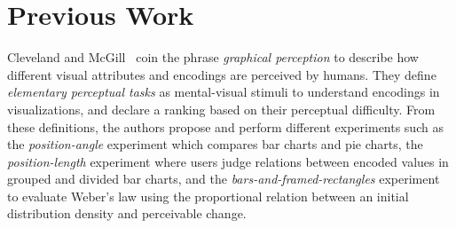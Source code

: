 \section{Previous Work}

 Cleveland and McGill~\cite{cleveland_mcgill,cleveland1985graphical} coin the phrase \emph{graphical perception} to describe how different visual attributes and encodings are perceived by humans. They define \emph{elementary perceptual tasks} as mental-visual stimuli to understand encodings in visualizations, and declare a ranking based on their perceptual difficulty. From these definitions, the authors propose and perform different experiments such as the \emph{position-angle} experiment which compares bar charts and pie charts, the \emph{position-length} experiment where users judge relations between encoded values in grouped and divided bar charts, and the \emph{bars-and-framed-rectangles} experiment to evaluate Weber's law \cite{harrison2014_webers_law_rank} using the proportional relation between an initial distribution density and perceivable change.


